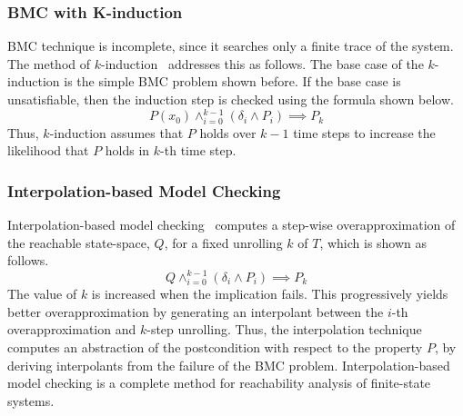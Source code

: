 \subsubsection{BMC with K-induction} 
%
BMC technique is incomplete, since it searches only a finite trace of the system. 
The method of $k$-induction~\cite{fmcad2000} addresses this as follows.
%
The base case of the $k$-induction is the simple BMC problem shown before. If the 
base case is unsatisfiable, then the 
induction step is checked using the formula 
shown below.  
%
\[ P(x_0) \wedge_{i=0}^{k-1} (\delta_i \wedge P_i) \implies P_k \]
%
Thus, $k$-induction assumes that $P$ holds 
over $k-1$ time steps to increase the 
likelihood that $P$ holds in $k$-th time step.
%
\subsubsection{Interpolation-based Model Checking} 
%
Interpolation-based model checking~\cite{cav03} 
computes a step-wise overapproximation of the reachable state-space,
$Q$, for a fixed unrolling $k$ of $T$, which is shown as
follows.
%
\[ Q \wedge_{i=0}^{k-1} (\delta_i \wedge P_i) \implies P_k \]
%
The value of $k$ is increased when the implication fails. This
progressively yields better overapproximation by 
generating an interpolant between the $i$-th 
overapproximation and $k$-step unrolling.
Thus, the interpolation technique computes an abstraction 
of the postcondition with respect to the property $P$, 
by deriving interpolants from the failure of the
BMC problem.
%
Interpolation-based model checking is a complete method 
for reachability analysis of finite-state systems. 
%

